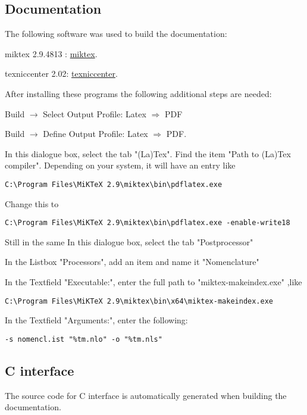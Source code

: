 \subsection{Documentation}

The following software was used to build the documentation:

miktex 2.9.4813 : \href{http://miktex.org/}{miktex}.

texniccenter 2.02: \href{http://www.texniccenter.org/}{texniccenter}.

After installing these programs the following additional steps are needed: 

\vpara

Build $\rightarrow$ Select Output Profile: Latex $\Rightarrow$ PDF

\vpara

Build $\rightarrow$ Define Output Profile: Latex $\Rightarrow$ PDF. 

In this dialogue box, select the tab "(La)Tex". Find the item "Path to (La)Tex compiler". 
Depending on your system, it will have an entry like

\begin{verbatim}
C:\Program Files\MiKTeX 2.9\miktex\bin\pdflatex.exe
\end{verbatim}

Change this to

\begin{verbatim}
C:\Program Files\MiKTeX 2.9\miktex\bin\pdflatex.exe -enable-write18
\end{verbatim}

\vpara
Still in the same In this dialogue box, select the tab "Postprocessor"

In the Listbox "Processors", add an item and name it "Nomenclature"

In the Textfield "Executable:", enter the full path to "miktex-makeindex.exe" ,like 
\begin{verbatim}
C:\Program Files\MiKTeX 2.9\miktex\bin\x64\miktex-makeindex.exe
\end{verbatim}
In the Textfield "Arguments:", enter the following:
\begin{verbatim}
-s nomencl.ist "%tm.nlo" -o "%tm.nls"
\end{verbatim}



\subsection{C interface}
The source code for C interface is automatically generated when building the documentation.


